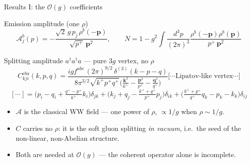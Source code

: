 \documentclass[9pt,aspectratio=169]{beamer}
\newcommand{\hl}[1]{\textcolor{acc}{#1}}
\newcommand{\hb}[1]{\textcolor{blu}{#1}}
\newcommand{\pp}{p^{+}}
\newcommand{\kp}{k^{+}}
\newcommand{\dthree}[1]{\frac{d^{3}#1}{(2\pi)^{3}}}
\newcommand{\ad}{a^{\dagger}}
\begin{document}
\begin{frame}{Results I: the $\mathcal{O}(g)$ coefficients}
\begin{block}{Emission amplitude (one $\rho$)}
\[
\mathcal{A}^{b}_{j}(p)=-\frac{\sqrt{2}\,g\,p_{j}\,\rho^{b}(-\bm p)}{\sqrt{\pp}\,\bm p^{2}},
\qquad
N=1-g^{2}\!\int\!\dthree{p}\frac{\rho^{b}(-\bm p)\rho^{b}(\bm p)}{\pp\,\bm p^{2}}
\]
\end{block}
\begin{block}{Splitting amplitude $\ad\ad a$ --- \hl{pure $3g$ vertex, no $\rho$}}
\[
C^{cba}_{kji}(k,p,q)=\frac{i g f^{abc}\,(2\pi)^{9/2}\,\delta^{(3)}(k-p-q)}
{8\pi^{3/2}\sqrt{\kp \pp q^{+}}\Big(\frac{\bm k^{2}}{\kp}-\frac{\bm p^{2}}{\pp}-\frac{\bm q^{2}}{q^{+}}\Big)}
\Big[\cdots\text{Lipatov-like vertex}\cdots\Big]
\]
\[
[\cdots]=\Big(p_{i}-q_{i}+\tfrac{q^{+}-\pp}{\kp}k_{i}\Big)\delta_{jk}
+\Big(k_{j}+q_{j}-\tfrac{\kp+q^{+}}{\pp}p_{j}\Big)\delta_{ik}
+\Big(\tfrac{\kp+\pp}{q^{+}}q_{k}-p_{k}-k_{k}\Big)\delta_{ij}
\]
\end{block}
\medskip
\begin{itemize}
  \item $\mathcal{A}$ is the classical WW field --- one power of $\rho$, \hl{$\propto 1/g$ when $\rho\sim1/g$}.
  \item $C$ carries \hb{no} $\rho$: it is the soft gluon splitting \emph{in vacuum},
        i.e.\ the seed of the non-linear, non-Abelian structure.
  \item \hl{Both are needed at $\mathcal{O}(g)$} --- the coherent operator alone is incomplete.
\end{itemize}
\end{frame}
\end{document}
